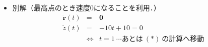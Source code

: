 \documentclass[a4paper,11pt]{ltjsarticle}
\begin{document}
\begin{enumerate}
\begin{itemize}
\begin{minipage}{\linewidth}
        \begin{equation}
        \renewcommand{\arraystretch}{2}
        \begin{array}{rcl}
          z(t)
          &=&
          −5t^2 + 10t + 3
          \\
          &=&
          −5\left(t^2 + \dfrac{10t}{−5}\right) + 3
          \\
          &=&
          −5(t^2 − 2t) + 3
          \\
          &=&
          −5(t^2 − 2t + 1^2 − 1^2) + 3
          \\
          &=&
          −5(t − 1)^2 + (−5 \cdot −1) + 3
          \\
          &=&
          −5(t − 1)^2 + 8\ \cdots\ 平方完成
        \end{array}
      \end{equation}
      \begin{center}
        $\therefore\ t=1$\ のとき\ $z_{\mathrm{max}}=8$
      \end{center}
    \end{minipage}


      \begin{equation}
        \renewcommand{\arraystretch}{2}
        \begin{array}{rcl}
          \bm{r}(1)
          &=&
          (2t+1 \quad 1 \quad -5t^{2}+10t+3) \ \cdots (\ast)
          \\
          &=&
          ((2 \times 1)+1 \quad 1 \quad (-5 \times 1)^{2}+(10 \times 1)+3)
          \\
          &=&
          (3 \quad 1 \quad 8)
          \\
        \end{array}
      \end{equation}

      \item 別解（最高点のとき速度$0$になることを利用．）
      \begin{equation}
        \renewcommand{\arraystretch}{2}
        \begin{array}{rcl}
          \dot{\bm{r}}(t)
          &=&
          \bm{0}
          \\
          \dot{z}(t)
          &=&
          -10t+10 =0
          \\
          &\Leftrightarrow&
          t=1\ \cdots あとは\ (\ast)\ の計算へ移動
          \\
        \end{array}
      \end{equation}
    \end{itemize}
  \end{enumerate}
\end{document}
